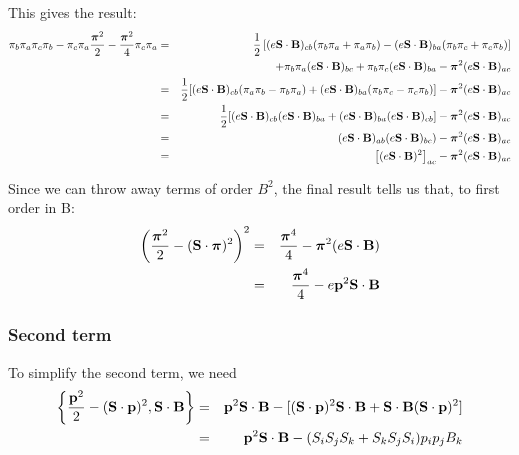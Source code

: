 This gives the result:
\begin{eqnarray*}
\pi_b \pi_a \pi_c \pi_b  
	- \pi_c \pi_a \frac{\mbox{\boldmath$ \pi $}^2}{2} 
	- \frac{\mbox{\boldmath$ \pi $}^2}{4} \pi_c \pi_a
	&=&	\frac{1}{2} \left [ (e \mathbf{S} \cdot \mathbf{B})_{cb} ( \pi_b \pi_a + \pi_a \pi_b)
				-  (e \mathbf{S} \cdot \mathbf{B})_{ba} (\pi_b \pi_c + \pi_c \pi_b)  \right  ] \\
	&&		+ \pi_b \pi_a (e \mathbf{S} \cdot \mathbf{B})_{bc} 
				+ \pi_b \pi_c (e \mathbf{S} \cdot \mathbf{B})_{ba}
				-\mbox{\boldmath$ \pi $}^2 (e \mathbf{S} \cdot \mathbf{B})_{ac}	\\
	&=&	\frac{1}{2} [(e \mathbf{S} \cdot \mathbf{B})_{cb} ( \pi_a \pi_b - \pi_b \pi_a)
				+ (e \mathbf{S} \cdot \mathbf{B})_{ba} (\pi_b \pi_c - \pi_c \pi_b)]
				-\mbox{\boldmath$ \pi $}^2 (e \mathbf{S} \cdot \mathbf{B})_{ac}	\\
	&=&	\frac{1}{2} [(e \mathbf{S} \cdot \mathbf{B})_{cb} (e \mathbf{S} \cdot \mathbf{B})_{ba}
				+ (e \mathbf{S} \cdot \mathbf{B})_{ba} (e \mathbf{S} \cdot \mathbf{B})_{cb}]
				-\mbox{\boldmath$ \pi $}^2 (e \mathbf{S} \cdot \mathbf{B})_{ac}	\\
	&=&	(e \mathbf{S} \cdot \mathbf{B})_{ab}(e \mathbf{S} \cdot \mathbf{B})_{bc})
				-\mbox{\boldmath$ \pi $}^2 (e \mathbf{S} \cdot \mathbf{B})_{ac}	\\
	&=&	\left[ (e \mathbf{S} \cdot \mathbf{B})^2 \right ]_{ac}
				-\mbox{\boldmath$ \pi $}^2 (e \mathbf{S} \cdot \mathbf{B})_{ac}	\\
\end{eqnarray*}

Since we can throw away terms of order $B^2$, the final result tells us that, to first order in B:
\begin{eqnarray*}
 \left(  \frac {\mbox{\boldmath$ \pi $}^2} {2} -  (\mathbf{S} \cdot \mbox{\boldmath$ \pi $})^2   \right )^2
	&=&	\frac{ \mbox{\boldmath$ \pi $}^4 } {4}  -  \mbox{\boldmath$ \pi $}^2 (e \mathbf{S} \cdot \mathbf{B}) \\
	&=& 	\frac{ \mbox{\boldmath$ \pi $}^4 } {4}  -  e \mathbf{p}^2  \mathbf{S} \cdot \mathbf{B} \\
\end{eqnarray*}

\subsubsection*{Second term}
To simplify the second term, we need
\begin{eqnarray*}
\left \{ \frac{\mathbf{p}^2}{2} - (\mathbf{S} \cdot \mathbf{p})^2, \mathbf{S} \cdot \mathbf{B} \right \}
	&=&	 \mathbf{p}^2 \mathbf{S} \cdot \mathbf{B} - [(\mathbf{S} \cdot \mathbf{p})^2 \mathbf{S} \cdot \mathbf{B} + \mathbf{S} \cdot \mathbf{B} (\mathbf{S} \cdot \mathbf{p})^2  ]	\\
	&=&	 \mathbf{p}^2 \mathbf{S} \cdot \mathbf{B} - (S_i S_j S_k + S_k S_j S_i) p_i p_j B_k
\end{eqnarray*}

